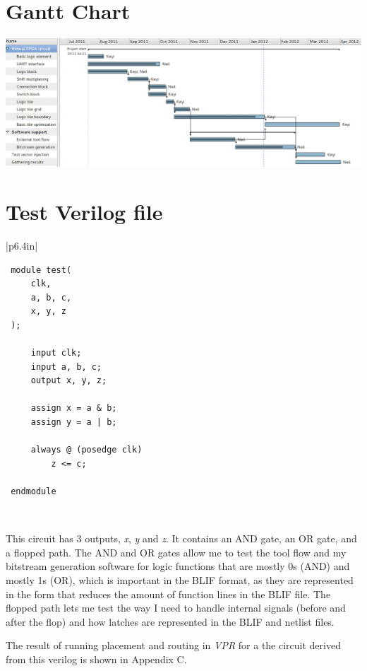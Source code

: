 \documentclass[12pt,letterpaper]{article}
\begin{document}
\pagebreak
\begin{appendices}



\pagebreak

\section{Gantt Chart}
\includegraphics[scale=0.45,angle=90]{gantt.png}


\pagebreak
\section{Test Verilog file}

\begin{tabular}{|p{6.4in}|}
\hline
\begin{verbatim}
 module test(
     clk,
     a, b, c,
     x, y, z
 );

     input clk;
     input a, b, c;
     output x, y, z;

     assign x = a & b;
     assign y = a | b;

     always @ (posedge clk)
         z <= c;

 endmodule
\end{verbatim}
\\ \hline
\end{tabular}

This circuit has 3 outputs, \emph{x}, \emph{y} and \emph{z}.
It contains an AND gate, an OR gate, and a flopped path.
The AND and OR gates allow me to test the tool flow and my bitstream generation software for logic functions that are mostly 0s (AND) and mostly 1s (OR), which is important in the BLIF format, as they are represented in the form that reduces the amount of function lines in the BLIF file.
The flopped path lets me test the way I need to handle internal signals (before and after the flop) and how latches are represented in the BLIF and netlist files.

The result of running placement and routing in \emph{VPR} for a the circuit derived from this verilog is shown in Appendix C.



\end{appendices}
\end{document}
